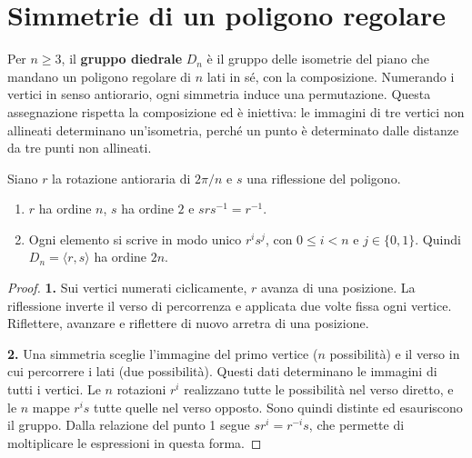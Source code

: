 \section{Simmetrie di un poligono regolare}
Per $n\ge3$, il \textbf{gruppo diedrale} $D_n$ è il gruppo delle isometrie del piano che mandano un poligono regolare di $n$ lati in sé, con la composizione. Numerando i vertici in senso antiorario, ogni simmetria induce una permutazione. Questa assegnazione rispetta la composizione ed è iniettiva: le immagini di tre vertici non allineati determinano un'isometria, perché un punto è determinato dalle distanze da tre punti non allineati.

\begin{proposizione}
Siano $r$ la rotazione antioraria di $2\pi/n$ e $s$ una riflessione del poligono.
\begin{enumerate}
\item $r$ ha ordine $n$, $s$ ha ordine $2$ e $srs^{-1}=r^{-1}$.
\item Ogni elemento si scrive in modo unico $r^i s^j$, con $0\le i<n$ e $j\in\{0,1\}$. Quindi $D_n=\langle r,s\rangle$ ha ordine $2n$.
\end{enumerate}
\end{proposizione}
\begin{proof}
\textbf{1.} Sui vertici numerati ciclicamente, $r$ avanza di una posizione. La riflessione inverte il verso di percorrenza e applicata due volte fissa ogni vertice. Riflettere, avanzare e riflettere di nuovo arretra di una posizione.

\textbf{2.} Una simmetria sceglie l'immagine del primo vertice ($n$ possibilità) e il verso in cui percorrere i lati (due possibilità). Questi dati determinano le immagini di tutti i vertici. Le $n$ rotazioni $r^i$ realizzano tutte le possibilità nel verso diretto, e le $n$ mappe $r^is$ tutte quelle nel verso opposto. Sono quindi distinte ed esauriscono il gruppo. Dalla relazione del punto 1 segue $sr^i=r^{-i}s$, che permette di moltiplicare le espressioni in questa forma.
\end{proof}

